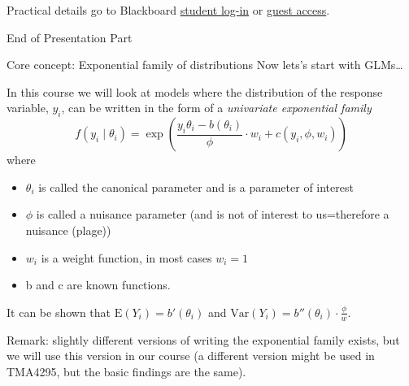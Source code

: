 \documentclass[
  ignorenonframetext,
]{beamer}
\begin{document}
\begin{frame}{Practical details}
\label{practical-details}
go to Blackboard \href{https://innsida.ntnu.no/bb-student}{student
log-in} or
\href{https://ntnu.blackboard.com/webapps/login?action=guest_login&new_loc=/webapps/blackboard/execute/courseMain?course_id=_11002_1}{guest
access}.
\end{frame}

\begin{frame}{End of Presentation Part}
\label{end-of-presentation-part}
\end{frame}

\begin{frame}{Core concept: Exponential family of distributions}
\label{core-concept-exponential-family-of-distributions}
Now lets's start with GLMs\ldots{}
\end{frame}

\begin{frame}
In this course we will look at models where the distribution of the
response variable, \(y_i\), can be written in the form of a
\emph{univariate exponential family}
\[ f(y_i\mid \theta_i)=\exp \left( \frac{y_i \theta_i-b(\theta_i)}{\phi}\cdot w_i + c(y_i, \phi, w_i) \right) \]
where

\begin{itemize}
\item
  \(\theta_i\) is called the canonical parameter and is a parameter of
  interest
\item
  \(\phi\) is called a nuisance parameter (and is not of interest to
  us=therefore a nuisance (plage))
\item
  \(w_i\) is a weight function, in most cases \(w_i=1\)
\item
  b and c are known functions.
\end{itemize}

It can be shown that \(\text{E}(Y_i)=b'(\theta_i)\) and
\(\text{Var}(Y_i)=b''(\theta_i)\cdot \frac{\phi}{w}\).

Remark: slightly different versions of writing the exponential family
exists, but we will use this version in our course (a different version
might be used in TMA4295, but the basic findings are the same).
\end{frame}
\end{document}
